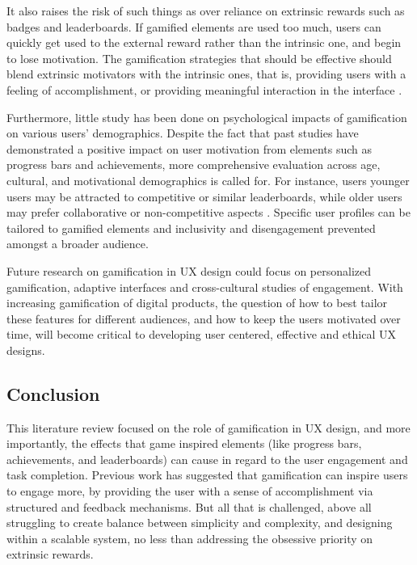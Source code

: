 \documentclass[conference]{IEEEtran}
\begin{document}
It also raises the risk of such things as over reliance on extrinsic rewards such as badges and leaderboards. If gamified elements are used too much, users can quickly get used to the external reward rather than the intrinsic one, and begin to lose motivation. The gamification strategies that should be effective should blend extrinsic motivators with the intrinsic ones, that is, providing users with a feeling of accomplishment, or providing meaningful interaction in the interface \cite{deliu2017, healey2011}.

Furthermore, little study has been done on psychological impacts of gamification on various users’ demographics. Despite the fact that past studies have demonstrated a positive impact on user motivation from elements such as progress bars and achievements, more comprehensive evaluation across age, cultural, and motivational demographics is called for. For instance, users younger users may be attracted to competitive or similar leaderboards, while older users may prefer collaborative or non-competitive aspects \cite{hiererra2022, kompaniets2020}. Specific user profiles can be tailored to gamified elements and inclusivity and disengagement prevented amongst a broader audience.

Future research on gamification in UX design could focus on personalized gamification, adaptive interfaces and cross-cultural studies of engagement. With increasing gamification of digital products, the question of how to best tailor these features for different audiences, and how to keep the users motivated over time, will become critical to developing user centered, effective and ethical UX designs.

\subsection{Conclusion}

This literature review focused on the role of gamification in UX design, and more importantly, the effects that game inspired elements (like progress bars, achievements, and leaderboards) can cause in regard to the user engagement and task completion. Previous work has suggested that gamification can inspire users to engage more, by providing the user with a sense of accomplishment via structured and feedback mechanisms. But all that is challenged, above all struggling to create balance between simplicity and complexity, and designing within a scalable system, no less than addressing the obsessive priority on extrinsic rewards.
\end{document}
